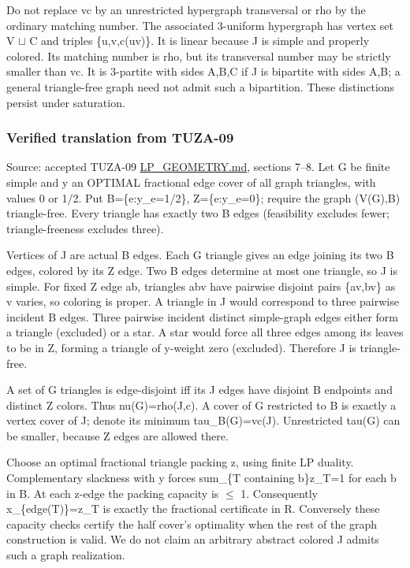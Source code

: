\documentclass[11pt]{article}
\begin{document}
Do not replace vc by an unrestricted hypergraph transversal or rho by the ordinary matching number. The associated 3-uniform hypergraph has vertex set V \(\sqcup\) C and triples \{u,v,c(uv)\}. It is linear because J is simple and properly colored. Its matching number is rho, but its transversal number may be strictly smaller than vc. It is 3-partite with sides A,B,C if J is bipartite with sides A,B; a general triangle-free graph need not admit such a bipartition. These distinctions persist under saturation.

\subsubsection{Verified translation from TUZA-09}\label{verified-translation-from-tuza-09}

Source: accepted TUZA-09 \href{https://github.com/pappa211/ai-math-experiments/blob/main/problems/TUZA-09/notes/LP_GEOMETRY.md}{LP\_GEOMETRY.md}, sections 7--8. Let G be finite simple and y an OPTIMAL fractional edge cover of all graph triangles, with values 0 or 1/2. Put B=\{e:y\_e=1/2\}, Z=\{e:y\_e=0\}; require the graph (V(G),B) triangle-free. Every triangle has exactly two B edges (feasibility excludes fewer; triangle-freeness excludes three).

Vertices of J are actual B edges. Each G triangle gives an edge joining its two B edges, colored by its Z edge. Two B edges determine at most one triangle, so J is simple. For fixed Z edge ab, triangles abv have pairwise disjoint pairs \{av,bv\} as v varies, so coloring is proper. A triangle in J would correspond to three pairwise incident B edges. Three pairwise incident distinct simple-graph edges either form a triangle (excluded) or a star. A star would force all three edges among its leaves to be in Z, forming a triangle of y-weight zero (excluded). Therefore J is triangle-free.

A set of G triangles is edge-disjoint iff its J edges have disjoint B endpoints and distinct Z colors. Thus nu(G)=rho(J,c). A cover of G restricted to B is exactly a vertex cover of J; denote its minimum tau\_B(G)=vc(J). Unrestricted tau(G) can be smaller, because Z edges are allowed there.

Choose an optimal fractional triangle packing z, using finite LP duality. Complementary slackness with y forces sum\_\{T containing b\}z\_T=1 for each b in B. At each z-edge the packing capacity is \(\le\) 1. Consequently x\_\{edge(T)\}=z\_T is exactly the fractional certificate in R. Conversely these capacity checks certify the half cover's optimality when the rest of the graph construction is valid. We do not claim an arbitrary abstract colored J admits such a graph realization.
\end{document}
